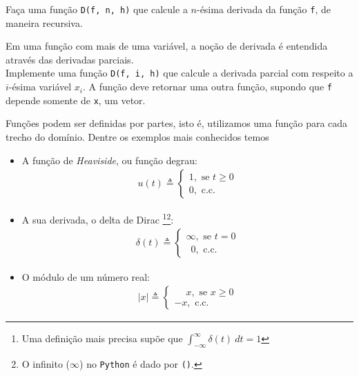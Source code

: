 \documentclass[12pt]{article}
\begin{document}
	\quest Faça uma função \texttt{D(f, n, h)} que calcule a $n$-ésima derivada da função \texttt{f}, de maneira recursiva.
	
	\label{p:diferencial3}
	
	Em uma função com mais de uma variável, a noção de derivada é entendida através das derivadas parciais.\\
	
	\quest Implemente uma função \texttt{D(f, i, h)} que calcule a derivada parcial com respeito a $i$-ésima variável $x_i$. A função deve retornar uma outra função, supondo que \texttt{f} depende somente de \texttt{x}, um vetor.
	
	
	
	Funções podem ser definidas por partes, isto é, utilizamos uma função para cada trecho do domínio. Dentre os exemplos mais conhecidos temos

\begin{itemize}

	\item[] A função de \textit{Heaviside}, ou função degrau:
	\begin{align*}
		u(t) \triangleq	\begin{cases}
		1, \text{ se } t \geq 0\\
		0, \text{ c.c.}
		\end{cases}
	\end{align*}
	
	\item[] A sua derivada, o delta de Dirac \footnote{Uma definição mais precisa supõe que $\displaystyle \int_{-\infty}^{\infty} \delta(t)\ dt = 1$}\footnote{O infinito ($\infty$) no \texttt{Python} é dado por \texttt{()}.}:
	\begin{align*}
		\delta(t) \triangleq	\begin{cases}
		\infty, \text{ se } t = 0\\
		\phantom{0}0, \text{ c.c.}
		\end{cases}
	\end{align*}
	
	\item[] O módulo de um número real:
	\begin{align*}
		|x| \triangleq	\begin{cases}
		\phantom{-}x, \text{ se } x \geq 0\\
		-x, \text{ c.c.}
		\end{cases}
	\end{align*}	
\end{itemize}
	
\end{document}
